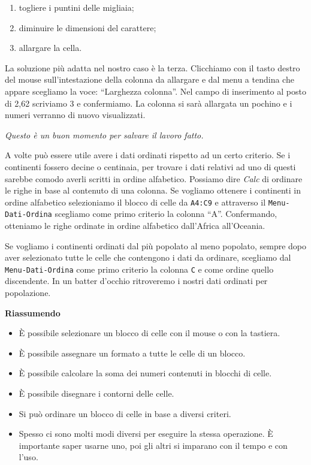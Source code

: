 \begin{enumerate} [noitemsep]
\item togliere i puntini delle migliaia;
\item diminuire le dimensioni del carattere;
\item allargare la cella.
\end{enumerate}

La soluzione più adatta nel nostro caso è la terza.
Clicchiamo con il tasto destro del mouse sull'intestazione della colonna da
allargare e dal menu a tendina che appare scegliamo la voce:
``Larghezza colonna''.
Nel campo di inserimento al posto di 2,62 scriviamo 3 e confermiamo.
La colonna si sarà allargata un pochino e i numeri verranno di nuovo
visualizzati.

\emph{Questo è un buon momento per salvare il lavoro fatto.}

A volte può essere utile avere i dati ordinati rispetto ad un certo criterio.
Se i continenti fossero decine o centinaia, per trovare i dati relativi ad
uno di questi sarebbe comodo averli scritti in ordine alfabetico.
Possiamo dire \emph{Calc} di ordinare le righe in base
al contenuto di una colonna.
Se vogliamo ottenere i continenti in ordine alfabetico selezioniamo il blocco
di celle da \texttt{A4:C9} e attraverso il \texttt{Menu-Dati-Ordina} scegliamo 
come
primo criterio la colonna ``A''.
Confermando, otteniamo le righe ordinate in ordine alfabetico dall'Africa
all'Oceania.

Se vogliamo i continenti ordinati dal più popolato al meno popolato, sempre
dopo aver selezionato tutte le celle che contengono i dati da ordinare,
scegliamo dal \texttt{Menu-Dati-Ordina} come primo criterio la colonna 
\texttt{C} e
come ordine quello discendente.
In un batter d'occhio ritroveremo i nostri dati ordinati per popolazione.

\textbf{Riassumendo}

\begin{itemize} [noitemsep]
\item È possibile selezionare un blocco di celle con il mouse o con la tastiera.
\item È possibile assegnare un formato a tutte le celle di un blocco.
\item È possibile calcolare la soma dei numeri contenuti in blocchi di celle.
\item È possibile disegnare i contorni delle celle.
\item Si può ordinare un blocco di celle in base a diversi criteri.
\item Spesso ci sono molti modi diversi per eseguire la stessa operazione.
È importante saper usarne uno, poi gli altri si imparano con il tempo e
con l'uso.
\end{itemize}

